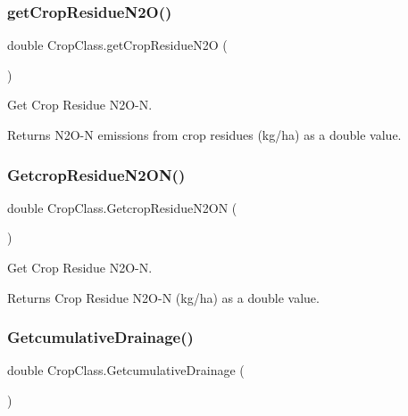 \subsubsection{\texorpdfstring{getCropResidueN2O()}{getCropResidueN2O()}}
{\footnotesize\ttfamily double Crop\+Class.\+get\+Crop\+Residue\+N2O (\begin{DoxyParamCaption}{ }\end{DoxyParamCaption})\hspace{0.3cm}{\ttfamily [inline]}}



Get Crop Residue N2\+O-\/N. 

\begin{DoxyReturn}{Returns}
N2\+O-\/N emissions from crop residues (kg/ha) as a double value. 
\end{DoxyReturn}
\mbox{\label{class_crop_class_adc8b83cb3bc454c4072c1aafa74db691}} 
\subsubsection{\texorpdfstring{GetcropResidueN2ON()}{GetcropResidueN2ON()}}
{\footnotesize\ttfamily double Crop\+Class.\+Getcrop\+Residue\+N2\+ON (\begin{DoxyParamCaption}{ }\end{DoxyParamCaption})\hspace{0.3cm}{\ttfamily [inline]}}



Get Crop Residue N2\+O-\/N. 

\begin{DoxyReturn}{Returns}
Crop Residue N2\+O-\/N (kg/ha) as a double value. 
\end{DoxyReturn}
\mbox{\label{class_crop_class_a6d1f5ebe9d9f9c5e218f2ebaeb9dd959}} 
\subsubsection{\texorpdfstring{GetcumulativeDrainage()}{GetcumulativeDrainage()}}
{\footnotesize\ttfamily double Crop\+Class.\+Getcumulative\+Drainage (\begin{DoxyParamCaption}{ }\end{DoxyParamCaption})\hspace{0.3cm}{\ttfamily [inline]}}



